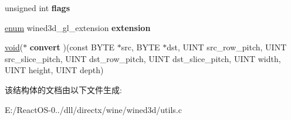 \begin{DoxyCompactItemize}
unsigned int {\bfseries flags}
\item 
\mbox{\label{structwined3d__format__texture__info_a13bfe964d68b1b2d985674f6716ced12}} 
\hyperlink{interfaceenum}{enum} wined3d\+\_\+gl\+\_\+extension {\bfseries extension}
\item 
\mbox{\label{structwined3d__format__texture__info_a17447c662b64fc21d21452e91faeebce}} 
\hyperlink{interfacevoid}{void}($\ast$ {\bfseries convert} )(const B\+Y\+TE $\ast$src, B\+Y\+TE $\ast$dst, U\+I\+NT src\+\_\+row\+\_\+pitch, U\+I\+NT src\+\_\+slice\+\_\+pitch, U\+I\+NT dst\+\_\+row\+\_\+pitch, U\+I\+NT dst\+\_\+slice\+\_\+pitch, U\+I\+NT width, U\+I\+NT height, U\+I\+NT depth)
\end{DoxyCompactItemize}


该结构体的文档由以下文件生成\+:\begin{DoxyCompactItemize}
\item 
E\+:/\+React\+O\+S-\/0../dll/directx/wine/wined3d/utils.\+c\end{DoxyCompactItemize}
